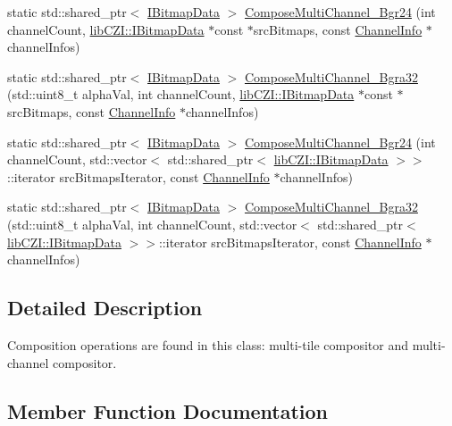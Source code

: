 \begin{DoxyCompactItemize}
static std\+::shared\+\_\+ptr$<$ \hyperlink{classlib_c_z_i_1_1_i_bitmap_data}{I\+Bitmap\+Data} $>$ \hyperlink{classlib_c_z_i_1_1_compositors_a9cdaf16fcd6a53e5bfe9799e9ebacb49}{Compose\+Multi\+Channel\+\_\+\+Bgr24} (int channel\+Count, \hyperlink{classlib_c_z_i_1_1_i_bitmap_data}{lib\+C\+Z\+I\+::\+I\+Bitmap\+Data} $\ast$const $\ast$src\+Bitmaps, const \hyperlink{structlib_c_z_i_1_1_compositors_1_1_channel_info}{Channel\+Info} $\ast$channel\+Infos)
\item 
static std\+::shared\+\_\+ptr$<$ \hyperlink{classlib_c_z_i_1_1_i_bitmap_data}{I\+Bitmap\+Data} $>$ \hyperlink{classlib_c_z_i_1_1_compositors_ab21ef822365578b550adb9ececd6eab7}{Compose\+Multi\+Channel\+\_\+\+Bgra32} (std\+::uint8\+\_\+t alpha\+Val, int channel\+Count, \hyperlink{classlib_c_z_i_1_1_i_bitmap_data}{lib\+C\+Z\+I\+::\+I\+Bitmap\+Data} $\ast$const $\ast$src\+Bitmaps, const \hyperlink{structlib_c_z_i_1_1_compositors_1_1_channel_info}{Channel\+Info} $\ast$channel\+Infos)
\item 
static std\+::shared\+\_\+ptr$<$ \hyperlink{classlib_c_z_i_1_1_i_bitmap_data}{I\+Bitmap\+Data} $>$ \hyperlink{classlib_c_z_i_1_1_compositors_a864b76a31ca73d8d6303120bf09b2370}{Compose\+Multi\+Channel\+\_\+\+Bgr24} (int channel\+Count, std\+::vector$<$ std\+::shared\+\_\+ptr$<$ \hyperlink{classlib_c_z_i_1_1_i_bitmap_data}{lib\+C\+Z\+I\+::\+I\+Bitmap\+Data} $>$$>$\+::iterator src\+Bitmaps\+Iterator, const \hyperlink{structlib_c_z_i_1_1_compositors_1_1_channel_info}{Channel\+Info} $\ast$channel\+Infos)
\item 
static std\+::shared\+\_\+ptr$<$ \hyperlink{classlib_c_z_i_1_1_i_bitmap_data}{I\+Bitmap\+Data} $>$ \hyperlink{classlib_c_z_i_1_1_compositors_a74911c9ae64b0843639352c2af69f680}{Compose\+Multi\+Channel\+\_\+\+Bgra32} (std\+::uint8\+\_\+t alpha\+Val, int channel\+Count, std\+::vector$<$ std\+::shared\+\_\+ptr$<$ \hyperlink{classlib_c_z_i_1_1_i_bitmap_data}{lib\+C\+Z\+I\+::\+I\+Bitmap\+Data} $>$$>$\+::iterator src\+Bitmaps\+Iterator, const \hyperlink{structlib_c_z_i_1_1_compositors_1_1_channel_info}{Channel\+Info} $\ast$channel\+Infos)
\end{DoxyCompactItemize}


\subsection{Detailed Description}
Composition operations are found in this class\+: multi-\/tile compositor and multi-\/channel compositor. 

\subsection{Member Function Documentation}
\mbox{\label{classlib_c_z_i_1_1_compositors_ab9be96d1b2b2e48c60c4dbf967e593c1}} 
